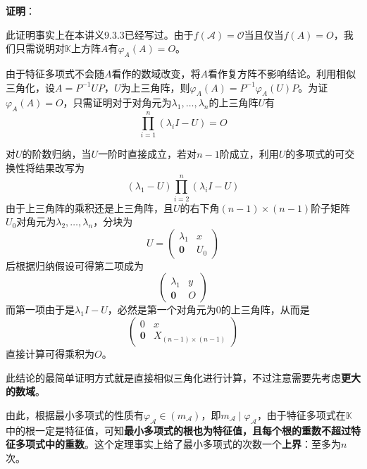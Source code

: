 \documentclass[a4paper,UTF8,fontset=windows,AutoFakeBold]{ctexart}
\newcommand*{\ma}{\mathcal{A}}
\newcommand*{\mo}{\mathcal{O}}
\newcommand*{\note}{\noindent *}
\newcommand{\proo}[1]{{\vspace{5pt}\kaishu\noindent\textbf{证明}：\vspace{-3pt}
\begin{compactitem}
    \item[] #1
\end{compactitem}
}}
\begin{document}
\proo{
    此证明事实上在本讲义9.3.3已经写过。由于$f(\ma)=\mo$当且仅当$f(A)=O$，我们只需说明对$\mathbb{K}$上方阵$A$有$\varphi_A(A)=O$。

    由于特征多项式不会随$A$看作的数域改变，将$A$看作复方阵不影响结论。利用相似三角化，设$A=P^{-1}UP$，$U$为上三角阵，则$\varphi_A(A)=P^{-1}\varphi_A(U)P$。为证$\varphi_A(A)=O$，只需证明对于对角元为$\lambda_1,\dots,\lambda_n$的上三角阵$U$有
    $$\prod_{i=1}^n(\lambda_iI-U)=O$$

    对$U$的阶数归纳，当$U$一阶时直接成立，若对$n-1$阶成立，利用$U$的多项式的可交换性将结果改写为
    $$(\lambda_1-U)\prod_{i=2}^n(\lambda_iI-U)$$
    由于上三角阵的乘积还是上三角阵，且$U$的右下角$(n-1)\times(n-1)$阶子矩阵$U_0$对角元为$\lambda_2,\dots,\lambda_n$，分块为
    $$U=\begin{pmatrix}\lambda_1&x\\\mathbf{0}&U_0\end{pmatrix}$$
    后根据归纳假设可得第二项成为
    $$\begin{pmatrix}\lambda_1&y\\\mathbf{0}&O\end{pmatrix}$$
    而第一项由于是$\lambda_1I-U$，必然是第一个对角元为0的上三角阵，从而是
    $$\begin{pmatrix}0&x\\\mathbf{0}&X_{(n-1)\times(n-1)}\end{pmatrix}$$
    直接计算可得乘积为$O$。

    \note 此结论的最简单证明方式就是直接相似三角化进行计算，不过注意需要先考虑\textbf{更大的数域}。
}

由此，根据最小多项式的性质有$\varphi_\ma\in(m_\ma)$，即$m_\ma\mid\varphi_\ma$，由于特征多项式在$\mathbb{K}$中的根一定是特征值，可知\textbf{最小多项式的根也为特征值，且每个根的重数不超过特征多项式中的重数}。这个定理事实上给了最小多项式的次数一个\textbf{上界}：至多为$n$次。

\
\end{document}
